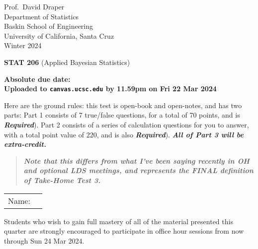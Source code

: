 \documentclass[12pt]{article}
\newcommand{\bi}[1]{\b{\i{#1}}}
\renewcommand{\b}[1]{\textbf{#1}}
\renewcommand{\i}[1]{\textit{#1}}
\begin{document}
\begin{flushleft}

Prof.~David Draper \\
Department of Statistics \\
Baskin School of Engineering \\
University of California, Santa Cruz \\
Winter 2024

\end{flushleft}

\Large

\begin{center}

\b{STAT 206} (\textsf{Applied Bayesian Statistics})


\large

\textbf{Absolute due date: \\ Uploaded to \texttt{canvas.ucsc.edu} by 11.59pm on Fri 22 Mar 2024}

\end{center}

\normalsize

Here are the ground rules: this test is open-book and open-notes, and has two parts: Part 1 consists of 7 true/false questions, for a total of 70 points, and is \bi{Required}). Part 2 consists of a series of calculation questions for you to answer, with a total point value of 220, and is also \bi{Required}). \bi{All of Part 3 will be extra-credit.} 

\begin{quote}

\bi{\color{BrickRed} Note that this differs from what I've been saying recently in OH and optional LDS meetings, and represents the FINAL definition of Take-Home Test 3.}

\end{quote}

\begin{tabular}{ll}

\hspace*{-0.14in} Name: \underline{\color{blue}{Devanathan Nallur Gandamani (2086936)} \hspace*{3.0in}} \\

\end{tabular}

Students who wish to gain full mastery of all of the material presented this quarter are strongly encouraged to participate in office hour sessions from now through Sun 24 Mar 2024.
\end{document}
